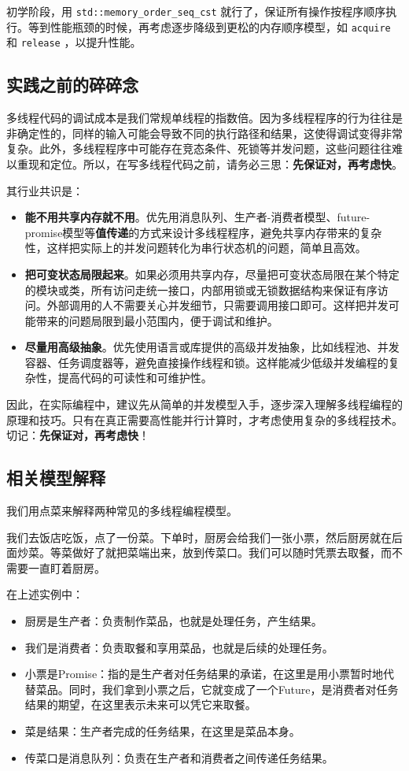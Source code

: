 初学阶段，用 \texttt{std::memory\_order\_seq\_cst} 就行了，保证所有操作按程序顺序执行。等到性能瓶颈的时候，再考虑逐步降级到更松的内存顺序模型，如 \texttt{acquire} 和 \texttt{release} ，以提升性能。

\subsection{实践之前的碎碎念}

多线程代码的调试成本是我们常规单线程的指数倍。因为多线程程序的行为往往是非确定性的，同样的输入可能会导致不同的执行路径和结果，这使得调试变得非常复杂。此外，多线程程序中可能存在竞态条件、死锁等并发问题，这些问题往往难以重现和定位。所以，在写多线程代码之前，请务必三思：\textbf{先保证对，再考虑快}。

其行业共识是：
\begin{itemize}
    \item \textbf{能不用共享内存就不用}。优先用消息队列、生产者-消费者模型、future-promise模型等\textbf{值传递}的方式来设计多线程程序，避免共享内存带来的复杂性，这样把实际上的并发问题转化为串行状态机的问题，简单且高效。
    \item \textbf{把可变状态局限起来}。如果必须用共享内存，尽量把可变状态局限在某个特定的模块或类，所有访问走统一接口，内部用锁或无锁数据结构来保证有序访问。外部调用的人不需要关心并发细节，只需要调用接口即可。这样把并发可能带来的问题局限到最小范围内，便于调试和维护。
    \item \textbf{尽量用高级抽象}。优先使用语言或库提供的高级并发抽象，比如线程池、并发容器、任务调度器等，避免直接操作线程和锁。这样能减少低级并发编程的复杂性，提高代码的可读性和可维护性。
\end{itemize}

因此，在实际编程中，建议先从简单的并发模型入手，逐步深入理解多线程编程的原理和技巧。只有在真正需要高性能并行计算时，才考虑使用复杂的多线程技术。切记：\textbf{先保证对，再考虑快}！

\subsection{相关模型解释}

我们用点菜来解释两种常见的多线程编程模型。

我们去饭店吃饭，点了一份菜。下单时，厨房会给我们一张小票，然后厨房就在后面炒菜。等菜做好了就把菜端出来，放到传菜口。我们可以随时凭票去取餐，而不需要一直盯着厨房。

在上述实例中：
\begin{itemize}
    \item 厨房是生产者：负责制作菜品，也就是处理任务，产生结果。
    \item 我们是消费者：负责取餐和享用菜品，也就是后续的处理任务。
    \item 小票是Promise：指的是生产者对任务结果的承诺，在这里是用小票暂时地代替菜品。同时，我们拿到小票之后，它就变成了一个Future，是消费者对任务结果的期望，在这里表示未来可以凭它来取餐。
    \item 菜是结果：生产者完成的任务结果，在这里是菜品本身。
    \item 传菜口是消息队列：负责在生产者和消费者之间传递任务结果。
\end{itemize}

